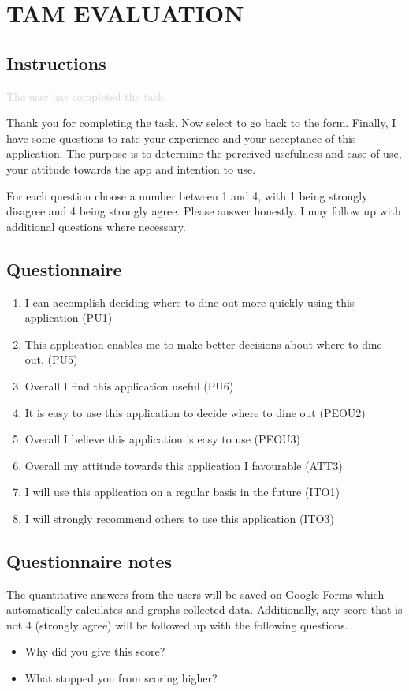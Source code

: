 \documentclass[a4 paper, 12pt]{article}
\begin{document}
\section*{TAM EVALUATION}
    \subsection*{Instructions}
        \textcolor{lightgray}{The user has completed the task.}

        \begin{itshape}
            Thank you for completing the task. Now select to go back to the form. Finally, I have some questions to rate your experience and your  acceptance of this application. The purpose is to determine the perceived usefulness and ease of use, your attitude towards the app and intention to use.

            For each question choose a number between 1 and 4, with 1 being strongly disagree and 4 being strongly agree. Please answer honestly. I may follow up with additional questions where necessary. 
        \end{itshape}

    \subsection*{Questionnaire}
        \begin{enumerate}
            \item I can accomplish deciding where to dine out more quickly using this application (PU1)
            \item This application enables me to make better decisions about where to dine out. (PU5)
            \item Overall I find this application useful (PU6)
            \item It is easy to use this application to decide where to dine out (PEOU2)
            \item Overall I believe this application is easy to use (PEOU3)
            \item Overall my attitude towards this application I favourable (ATT3)
            \item I will use this application on a regular basis in the future (ITO1)
            \item I will strongly recommend others to use this application (ITO3)
        \end{enumerate}

    \subsection*{Questionnaire notes}
        The quantitative answers from the users will be saved on Google Forms which automatically calculates and graphs collected data. Additionally, any score that is not 4 (strongly agree) will be followed up with the following questions.
        \begin{itemize}
            \item Why did you give this score?
            \item What stopped you from scoring higher?
        \end{itemize}
\end{document}
